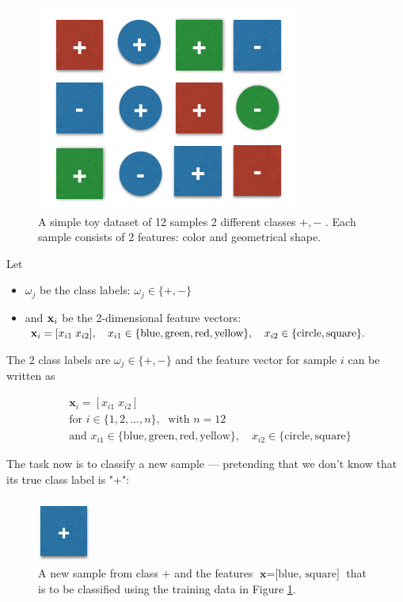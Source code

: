 \documentclass{article}
\begin{document}
\begin{figure}[h!]
\includegraphics[scale=0.5]{../images/toy_dataset_1.png}
\caption{A simple toy dataset of 12 samples 2 different classes $+, -$  . Each sample consists of 2 features: color and geometrical shape.}
\label{fig:toy_dataset}
\end{figure}

Let

\begin{itemize}
	\item $\omega_j$ be the class labels: $\omega_j \in \{+, -\}$
	\item and $\textbf x_i$  be the 2-dimensional feature vectors: $\textbf x_i = [x_{i1} \; x_{i2}], \quad x_{i1} \in \{ \text{blue}, \text{green}, \text{red}, \text{yellow} \}, \quad x_{i2} \in \{\text{circle}, \text{square} \}.$
\end{itemize}

The 2 class labels are $\omega_j \in \{+, -\}$ and the feature vector for sample $i$ can be written as

\begin{equation}
\begin{split}
& \textbf{x}_i = [x_{i1} \; x_{i2}] \\ 
& \text{for } i \in \{1, 2, ...,  n\}, \; \text{ with } n=12 \\
& \text{and } x_{i1} \in \{ \text{blue}, \text{green}, \text{red}, \text{yellow} \}, \quad x_{i2} \in \{\text{circle}, \text{square} \}
\end{split}
\end{equation}
 
 The task now is to classify a new sample --- pretending that we don't know that its true class label is "+":
 
 
 \begin{figure}[h!]
\includegraphics[scale=0.5]{../images/toy_dataset_2.png}
\caption{A new sample from class $+$ and the features $\textbf{x} = \text{[blue, square]}$ that is to be classified using the training data in Figure \ref{fig:toy_dataset}.}
\label{fig:new_sample1}
\end{figure}
 
\end{document}
